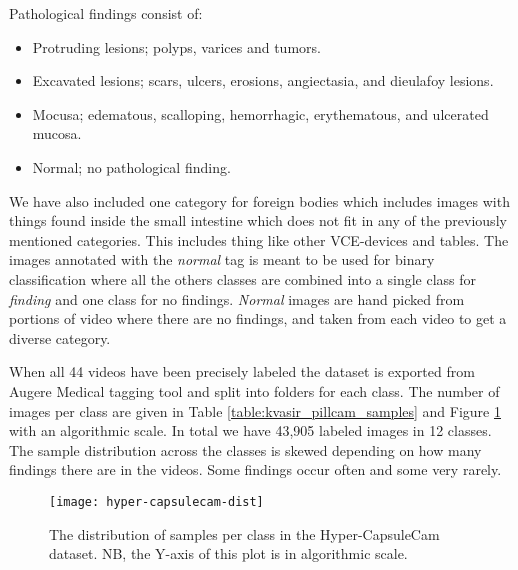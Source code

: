 \documentclass[thesis.tex]{subfiles}
\begin{document}
Pathological findings consist of:
\begin{itemize}
\item Protruding lesions; polyps, varices and tumors.
\item Excavated lesions; scars, ulcers, erosions, angiectasia, and dieulafoy lesions.
\item Mocusa; edematous, scalloping, hemorrhagic, erythematous, and ulcerated mucosa.
\item Normal; no pathological finding.
\end{itemize}

We have also included one category for foreign bodies which includes images with things found inside the small intestine which does not fit in any of the previously mentioned categories. This includes thing like other VCE-devices and tables. The images annotated with the \textit{normal} tag is meant to be used for binary classification where all the others classes are combined into a single class for \textit{finding} and one class for no findings. \textit{Normal} images are hand picked from portions of video where there are no findings, and taken from each video to get a diverse category.

When all 44 videos have been precisely labeled the dataset is exported from Augere Medical tagging tool and split into folders for each class. The number of images per class are given in Table \ref{table:kvasir_pillcam_samples} and Figure \ref{fig:hyper-capsulecam-dist} with an algorithmic scale. In total we have 43,905 labeled images in 12 classes. The sample distribution across the classes is skewed depending on how many findings there are in the videos. Some findings occur often and some very rarely. 

\begin{figure} %
  \begin{center}
    \texttt{[image: hyper-capsulecam-dist]}
    \caption[Distribution of samples per class in the Hyper-CapsuleCam dataset.]{The distribution of samples per class in the Hyper-CapsuleCam dataset. NB, the Y-axis of this plot is in algorithmic scale.}
    \label{fig:hyper-capsulecam-dist}
  \end{center}
\end{figure}
\end{document}
